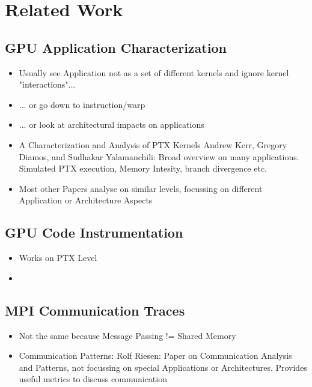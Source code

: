 \chapter{Related Work}
\section{GPU Application Characterization}
\begin{itemize}
	\item Usually see Application not as a set of different kernels and ignore kernel "interactions"...
	\item ... or go down to instruction/warp 
	\item ... or look at architectural impacts on applications
	\item A Characterization and Analysis of PTX Kernels
	Andrew Kerr, Gregory Diamos, and Sudhakar Yalamanchili: Broad overview on many applications. Simulated PTX execution, Memory Intesity, branch divergence etc.
	\item Most other Papers analyse on similar levels, focussing on different Application or Architecture Aspects
\end{itemize}
\section{GPU Code Instrumentation}
\begin{itemize}
	\item Works on PTX Level
	\item 
\end{itemize}
\section{MPI Communication Traces}
\begin{itemize}
	\item Not the same because Message Passing != Shared Memory
	\item Communication Patterns: Rolf Riesen: Paper on Communication Analysis and Patterns, not focussing on special Applications or Architectures. Provides useful metrics to discuss communication
\end{itemize}